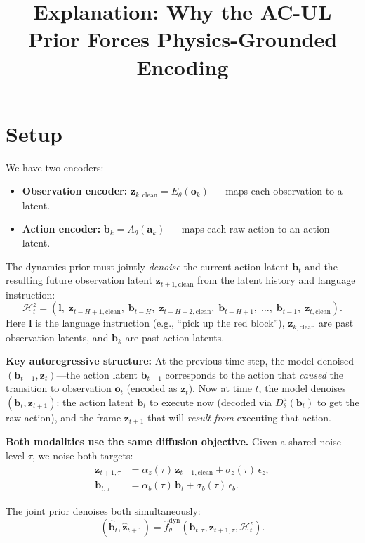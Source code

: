 \documentclass{article}
\title{Explanation: Why the AC-UL Prior Forces Physics-Grounded Encoding}
\author{}
\date{}
\newcommand{\vo}{\bm{o}}
\newcommand{\vz}{\bm{z}}
\newcommand{\va}{\bm{a}}
\newcommand{\vb}{\bm{b}}
\begin{document}
\maketitle

\section{Setup}

We have two encoders:
\begin{itemize}[leftmargin=*]
  \item \textbf{Observation encoder:} $\vz_{k,\text{clean}} = E_\theta(\vo_k)$ --- maps each observation to a latent.
  \item \textbf{Action encoder:} $\vb_k = A_\theta(\va_k)$ --- maps each raw action to an action latent.
\end{itemize}

The dynamics prior must jointly \emph{denoise} the current action latent $\vb_t$ and the resulting future observation latent $\vz_{t+1,\text{clean}}$ from the latent history and language instruction:
\[
  \mathcal{H}_t^z = (\bm{l},\; \vz_{t-H+1,\text{clean}},\; \vb_{t-H},\; \vz_{t-H+2,\text{clean}},\; \vb_{t-H+1},\; \ldots,\; \vb_{t-1},\; \vz_{t,\text{clean}}).
\]
Here $\bm{l}$ is the language instruction (e.g., ``pick up the red block''), $\vz_{k,\text{clean}}$ are past observation latents, and $\vb_k$ are past action latents.

\textbf{Key autoregressive structure:} At the previous time step, the model denoised $(\vb_{t-1}, \vz_t)$---the action latent $\vb_{t-1}$ corresponds to the action that \emph{caused} the transition to observation $\vo_t$ (encoded as $\vz_t$). Now at time $t$, the model denoises $(\vb_t, \vz_{t+1})$: the action latent $\vb_t$ to execute now (decoded via $D_\theta^a(\vb_t)$ to get the raw action), and the frame $\vz_{t+1}$ that will \emph{result from} executing that action.

\textbf{Both modalities use the same diffusion objective.}
Given a shared noise level $\tau$, we noise both targets:
\begin{align}
  \vz_{t+1,\tau} &= \alpha_z(\tau)\,\vz_{t+1,\text{clean}} + \sigma_z(\tau)\,\epsilon_z, \\
  \vb_{t,\tau} &= \alpha_b(\tau)\,\vb_t + \sigma_b(\tau)\,\epsilon_b.
\end{align}

The joint prior denoises both simultaneously:
\[
  (\hat{\vb}_t, \hat{\vz}_{t+1}) = \hat{f}_\theta^{\text{dyn}}(\vb_{t,\tau}, \vz_{t+1,\tau}, \mathcal{H}_t^z).
\]
\end{document}
